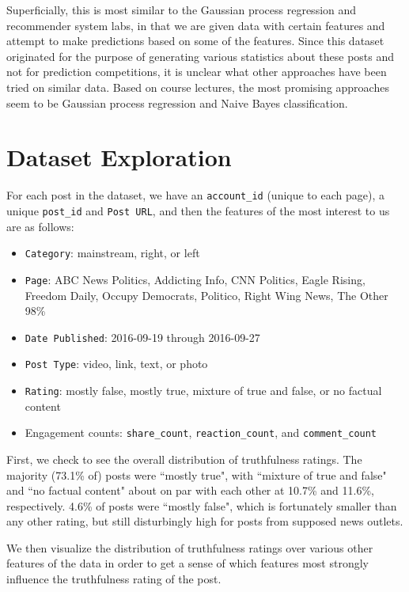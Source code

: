 \documentclass[12pt]{article}
\begin{document}
Superficially, this is most similar to the Gaussian process regression and recommender system labs, in that we are given data with certain features and attempt to make predictions based on some of the features. Since this dataset originated for the purpose of generating various statistics about these posts and not for prediction competitions, it is unclear what other approaches have been tried on similar data. Based on course lectures, the most promising approaches seem to be Gaussian process regression and Naive Bayes classification. 

\section*{Dataset Exploration}
For each post in the dataset, we have an \texttt{account\_id} (unique to each page), a unique \texttt{post\_id} and \texttt{Post URL}, and then the features of the most interest to us are as follows:

\begin{itemize}[noitemsep,nolistsep]
\item \texttt{Category}: mainstream, right, or left
\item \texttt{Page}: ABC News Politics, Addicting Info, CNN Politics, Eagle Rising, Freedom Daily, Occupy Democrats, Politico, Right Wing News, The Other 98\%
\item \texttt{Date Published}: 2016-09-19 through 2016-09-27
\item \texttt{Post Type}: video, link, text, or photo
\item \texttt{Rating}: mostly false, mostly true, mixture of true and false, or no factual content
\item Engagement counts: \texttt{share\_count}, \texttt{reaction\_count}, and \texttt{comment\_count}
\end{itemize}

First, we check to see the overall distribution of truthfulness ratings. The majority (73.1\% of) posts were ``mostly true", with ``mixture of true and false" and ``no factual content" about on par with each other at 10.7\% and 11.6\%, respectively. 4.6\% of posts were ``mostly false", which is fortunately smaller than any other rating, but still disturbingly high for posts from supposed news outlets.

We then visualize the distribution of truthfulness ratings over various other features of the data in order to get a sense of which features most strongly influence the truthfulness rating of the post.
\end{document}
